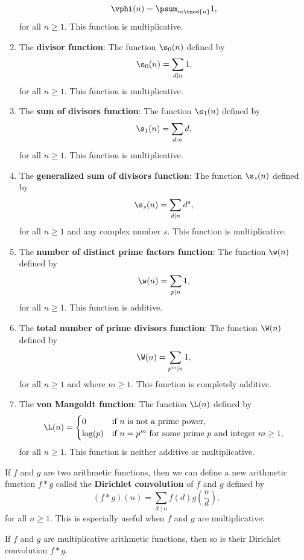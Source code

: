 \begin{enumerate}[label=(\roman*)]
      \[
        \vphi(n) = \psum_{m \tmod{n}}1,
      \]
      for all $n \ge 1$. This function is multiplicative.
      \item The \textbf{divisor function}: The function $\s_{0}(n)$ defined by
      \[
        \s_{0}(n) = \sum_{d \mid n}1,
      \]
      for all $n \ge 1$. This function is multiplicative.
      \item The \textbf{sum of divisors function}: The function $\s_{1}(n)$ defined by
      \[
        \s_{1}(n) = \sum_{d \mid n}d,
      \]
      for all $n \ge 1$. This function is multiplicative.
      \item The \textbf{generalized sum of divisors function}: The function $\s_{s}(n)$ defined by
      \[
        \s_{s}(n) = \sum_{d \mid n}d^{s},
      \]
      for all $n \ge 1$ and any complex number $s$. This function is multiplicative.
      \item The \textbf{number of distinct prime factors function}: The function $\w(n)$ defined by
      \[
        \w(n) = \sum_{p \mid n}1,
      \]
      for all $n \ge 1$. This function is additive.
      \item The \textbf{total number of prime divisors function}: The function $\W(n)$ defined by
      \[
        \W(n) = \sum_{p ^{m} \mid n}1,
      \]
      for all $n \ge 1$ and where $m \ge 1$. This function is completely additive.
      \item The \textbf{von Mangoldt function}: The function $\L(n)$ defined by
      \[
        \L(n) = \begin{cases} 0 & \text{if $n$ is not a prime power}, \\ \log(p) & \text{if $n = p^{m}$ for some prime $p$ and integer $m \ge 1$}, \end{cases}
      \]
      for all $n \ge 1$. This function is neither additive or multiplicative.
    \end{enumerate}
    If $f$ and $g$ are two arithmetic functions, then we can define a new arithmetic function $f \ast g$ called the \textbf{Dirichlet convolution} of $f$ and $g$ defined by
    \[
      (f \ast g)(n) = \sum_{d \mid n}f(d)g\left(\frac{n}{d}\right),
    \]
    for all $n \ge 1$. This is especially useful when $f$ and $g$ are multiplicative:

    \begin{proposition}
      If $f$ and $g$ are multiplicative arithmetic functions, then so is their Dirichlet convolution $f \ast g$.
    \end{proposition}
